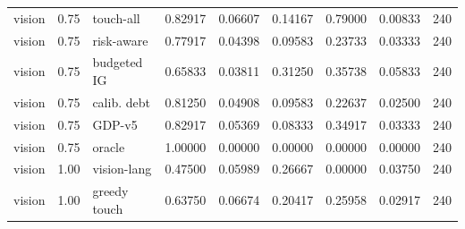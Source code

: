 \documentclass{article}
\begin{document}
\begin{center}
\begin{longtable}{lllllllll}
vision & 0.75 & touch-all & 0.82917 & 0.06607 & 0.14167 & 0.79000 & 0.00833 & 240 \\
vision & 0.75 & risk-aware & 0.77917 & 0.04398 & 0.09583 & 0.23733 & 0.03333 & 240 \\
vision & 0.75 & budgeted IG & 0.65833 & 0.03811 & 0.31250 & 0.35738 & 0.05833 & 240 \\
vision & 0.75 & calib. debt & 0.81250 & 0.04908 & 0.09583 & 0.22637 & 0.02500 & 240 \\
vision & 0.75 & GDP-v5 & 0.82917 & 0.05369 & 0.08333 & 0.34917 & 0.03333 & 240 \\
vision & 0.75 & oracle & 1.00000 & 0.00000 & 0.00000 & 0.00000 & 0.00000 & 240 \\
vision & 1.00 & vision-lang & 0.47500 & 0.05989 & 0.26667 & 0.00000 & 0.03750 & 240 \\
vision & 1.00 & greedy touch & 0.63750 & 0.06674 & 0.20417 & 0.25958 & 0.02917 & 240 \\
\bottomrule
\end{longtable}
\renewcommand{\arraystretch}{1.0}
\end{center}
\end{document}
